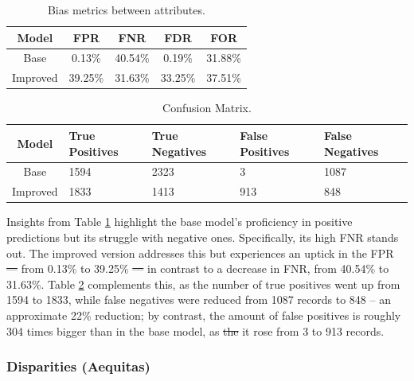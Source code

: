\documentclass[fleqn,10pt]{wlscirep}
\providecommand{\DIFadd}[1]{{\protect\color{blue}\uwave{#1}}} %
\providecommand{\DIFdel}[1]{{\protect\color{red}\sout{#1}}}                      %
\providecommand{\DIFaddbegin}{} %
\providecommand{\DIFaddend}{} %
\providecommand{\DIFdelbegin}{} %
\providecommand{\DIFdelend}{} %
\begin{document}
\begin{table}[!htb]
\centering
\begin{tabular}{|c|c|c|c|c|}

        \hline
        \textbf{Model} & \textbf{FPR} & \textbf{FNR} & \textbf{FDR} & \textbf{FOR} \\ \hline
        Base & 0.13\% & 40.54\% & 0.19\% & 31.88\%  \\ 
        Improved & 39.25\% & 31.63\% & 33.25\% & 37.51\% \\ 

        \hline
    \end{tabular}
\caption{Bias metrics between attributes.}
\label{tab_bias_tdrogas:}
\end{table}

\begin{table}[!htb]
\centering
\begin{tabular}{|c|p{3cm}|p{3cm}|p{3cm}|p{3cm}|}
        \hline
        \textbf{Model} & \textbf{True Positives} & \textbf{True Negatives} & \textbf{False Positives} & \textbf{False Negatives}\\ \hline
        Base & 1594 & 2323 & 3 & 1087  \\ 
        Improved & 1833 & 1413 & 913 & 848  \\ 
        \hline
    \end{tabular}
\caption{Confusion Matrix.}
\label{tab_cm_tdrogas:}
\end{table}

Insights from Table \ref{tab_bias_tdrogas:} highlight the base model's proficiency in positive predictions but its struggle with negative ones. Specifically, its high FNR stands out. The improved version addresses this but experiences an uptick in the FPR \DIFdelbegin \DIFdel{— }\DIFdelend \DIFaddbegin \DIFadd{-- }\DIFaddend from 0.13\% to 39.25\% \DIFdelbegin \DIFdel{— }\DIFdelend \DIFaddbegin \DIFadd{-- }\DIFaddend in contrast to a decrease in FNR, from 40.54\% to 31.63\%. Table \ref{tab_cm_tdrogas:} complements this, as the number of true positives went up from 1594 to 1833, while false negatives were reduced from 1087 records to 848 -- an approximate 22\% reduction; by contrast, the amount of false positives is roughly 304 times bigger than in the base model, as \DIFdelbegin \DIFdel{the }\DIFdelend it rose from 3 to 913 records.

\subsubsection{Disparities (Aequitas)}
\end{document}
